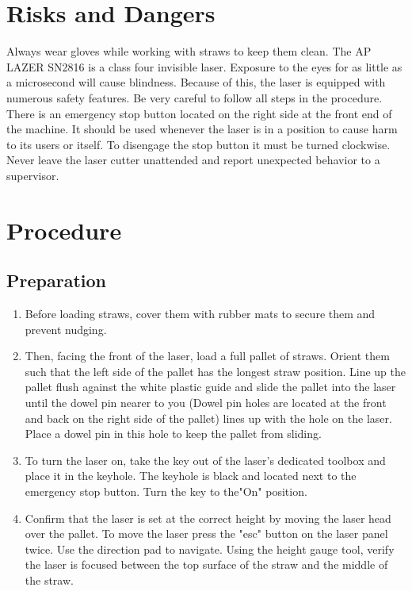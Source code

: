 \documentclass[A4,12pt]{article}
\begin{document}
\section{Risks and Dangers}
Always wear gloves while working with straws to keep them clean.  The AP LAZER SN2816 is a class four invisible laser.  Exposure to the eyes for as little as a microsecond will cause blindness.  Because of this, the laser is equipped with numerous safety features.  Be very careful to follow all steps in the procedure.  There is an emergency stop button located on the right side at the front end of the machine.  It should be used whenever the laser is in a position to cause harm to its users or itself.  To disengage the stop button it must be turned clockwise.  Never leave the laser cutter unattended and report unexpected behavior to a supervisor.





\section{Procedure}
	\subsection{Preparation}
\begin{enumerate}
	\item Before loading straws, cover them with rubber mats to secure them and prevent nudging.  		\item Then, facing the front of the laser, load a full pallet of straws.  Orient them such that the left side of the pallet has the longest straw position.  Line up the pallet flush against the white plastic guide and slide the pallet into the laser until the dowel pin nearer to you (Dowel pin holes are located at the front and back on the right side of the pallet) lines up with the hole on the laser.  Place a dowel pin in this hole to keep the pallet from sliding.  
    \item To turn the laser on, take the key out of the laser's dedicated toolbox and place it in the keyhole.  The keyhole is black and located next to the emergency stop button.  Turn the key to the"On" position.
    \item Confirm that the laser is set at the correct height by moving the laser head over the pallet.  To move the laser press the "esc" button on the laser panel twice.  Use the direction pad to navigate.  Using the height gauge tool, verify the laser is focused between the top surface of the straw and the middle of the straw. 
    \end{enumerate}
\end{document}
